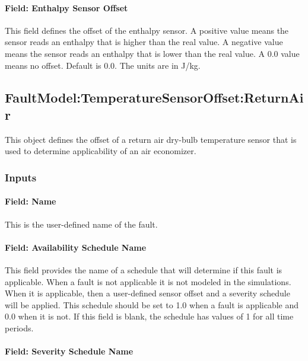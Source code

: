 \paragraph{Field: Enthalpy Sensor Offset}\label{field-enthalpy-sensor-offset}

This field defines the offset of the enthalpy sensor. A positive value means the sensor reads an enthalpy that is higher than the real value. A negative value means the sensor reads an enthalpy that is lower than the real value. A 0.0 value means no offset. Default is 0.0. The units are in J/kg.

\subsection{FaultModel:TemperatureSensorOffset:ReturnAir}\label{faultmodeltemperaturesensoroffsetreturnair}

This object defines the offset of a return air dry-bulb temperature sensor that is used to determine applicability of an air economizer.

\subsubsection{Inputs}\label{inputs-3-022}

\paragraph{Field: Name}\label{field-name-3-020}

This is the user-defined name of the fault.

\paragraph{Field: Availability Schedule Name}\label{field-availability-schedule-name-3-004}

This field provides the name of a schedule that will determine if this fault is applicable. When a fault is not applicable it is not modeled in the simulations. When it is applicable, then a user-defined sensor offset and a severity schedule will be applied. This schedule should be set to 1.0 when a fault is applicable and 0.0 when it is not. If this field is blank, the schedule has values of 1 for all time periods.

\paragraph{Field: Severity Schedule Name}\label{field-severity-schedule-name-3}


